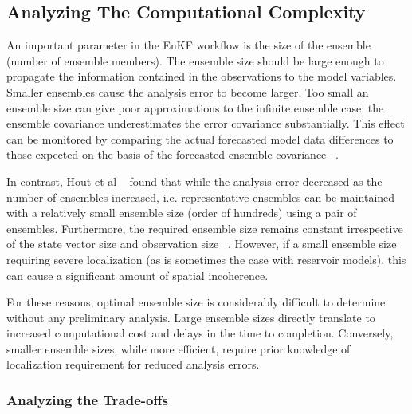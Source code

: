 \documentclass{acm_proc_article-sp}
\newcommand{\up}{\vspace*{-0.3em}}
\begin{document}
\subsection{Analyzing The Computational Complexity}



An important parameter in the EnKF workflow is the size of the
ensemble (number of ensemble members). The ensemble size should be
large enough to propagate the information contained in the
observations to the model variables. Smaller ensembles cause the
analysis error to become larger. Too small an ensemble size can give
poor approximations to the infinite ensemble case: the ensemble
covariance underestimates the error covariance substantially. This
effect can be monitored by comparing the actual forecasted model data
differences to those expected on the basis of the forecasted ensemble
covariance ~\cite{Burger98}.

In contrast, Hout et al ~\cite{Hout98} found that while the analysis error
decreased as the number of ensembles increased, i.e. representative
ensembles can be maintained with a relatively small ensemble size
(order of hundreds) using a pair of ensembles. Furthermore, the
required ensemble size remains constant irrespective of the state
vector size and observation size ~\cite{Mitchell02}. However, if a
small ensemble size requiring severe localization (as is sometimes the
case with reservoir models), this can cause a significant amount of
spatial incoherence.


For these reasons, optimal ensemble size is considerably difficult to
determine without any preliminary analysis. Large ensemble sizes
directly translate to increased computational cost and delays in the
time to completion. Conversely, smaller ensemble sizes, while more
efficient, require prior knowledge of localization requirement for
reduced analysis errors.
\up\up\up\up
\subsubsection{Analyzing the Trade-offs}  
\end{document}
